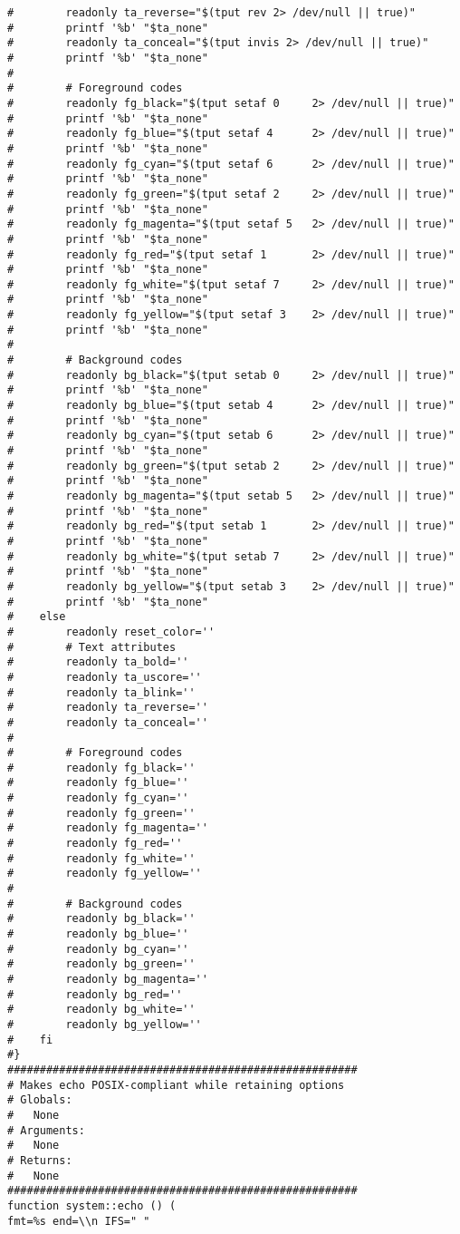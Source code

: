 \documentclass[11pt]{article}
\begin{document}
\begin{verbatim}
#        readonly ta_reverse="$(tput rev 2> /dev/null || true)"
#        printf '%b' "$ta_none"
#        readonly ta_conceal="$(tput invis 2> /dev/null || true)"
#        printf '%b' "$ta_none"
#
#        # Foreground codes
#        readonly fg_black="$(tput setaf 0     2> /dev/null || true)"
#        printf '%b' "$ta_none"
#        readonly fg_blue="$(tput setaf 4      2> /dev/null || true)"
#        printf '%b' "$ta_none"
#        readonly fg_cyan="$(tput setaf 6      2> /dev/null || true)"
#        printf '%b' "$ta_none"
#        readonly fg_green="$(tput setaf 2     2> /dev/null || true)"
#        printf '%b' "$ta_none"
#        readonly fg_magenta="$(tput setaf 5   2> /dev/null || true)"
#        printf '%b' "$ta_none"
#        readonly fg_red="$(tput setaf 1       2> /dev/null || true)"
#        printf '%b' "$ta_none"
#        readonly fg_white="$(tput setaf 7     2> /dev/null || true)"
#        printf '%b' "$ta_none"
#        readonly fg_yellow="$(tput setaf 3    2> /dev/null || true)"
#        printf '%b' "$ta_none"
#
#        # Background codes
#        readonly bg_black="$(tput setab 0     2> /dev/null || true)"
#        printf '%b' "$ta_none"
#        readonly bg_blue="$(tput setab 4      2> /dev/null || true)"
#        printf '%b' "$ta_none"
#        readonly bg_cyan="$(tput setab 6      2> /dev/null || true)"
#        printf '%b' "$ta_none"
#        readonly bg_green="$(tput setab 2     2> /dev/null || true)"
#        printf '%b' "$ta_none"
#        readonly bg_magenta="$(tput setab 5   2> /dev/null || true)"
#        printf '%b' "$ta_none"
#        readonly bg_red="$(tput setab 1       2> /dev/null || true)"
#        printf '%b' "$ta_none"
#        readonly bg_white="$(tput setab 7     2> /dev/null || true)"
#        printf '%b' "$ta_none"
#        readonly bg_yellow="$(tput setab 3    2> /dev/null || true)"
#        printf '%b' "$ta_none"
#    else
#        readonly reset_color=''
#        # Text attributes
#        readonly ta_bold=''
#        readonly ta_uscore=''
#        readonly ta_blink=''
#        readonly ta_reverse=''
#        readonly ta_conceal=''
#        
#        # Foreground codes
#        readonly fg_black=''
#        readonly fg_blue=''
#        readonly fg_cyan=''
#        readonly fg_green=''
#        readonly fg_magenta=''
#        readonly fg_red=''
#        readonly fg_white=''
#        readonly fg_yellow=''
#        
#        # Background codes
#        readonly bg_black=''
#        readonly bg_blue=''
#        readonly bg_cyan=''
#        readonly bg_green=''
#        readonly bg_magenta=''
#        readonly bg_red=''
#        readonly bg_white=''
#        readonly bg_yellow=''
#    fi
#}
######################################################
# Makes echo POSIX-compliant while retaining options
# Globals:
#   None
# Arguments:
#   None
# Returns:
#   None
######################################################
function system::echo () (
fmt=%s end=\\n IFS=" "


\end{verbatim}
\end{document}
